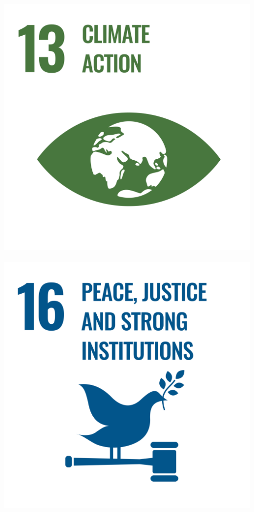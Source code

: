 \documentclass[../SustainableHEP.tex]{subfiles}
\begin{document}
\begin{center}
\includegraphics[width=\SDGsize]{Sections/Figs/Common/SDG_13_ClimateAction.png}~%
\includegraphics[width=\SDGsize]{Sections/Figs/Common/SDG_16_PeaceJusticeStrongInstitutions.png}~%

\end{center}
\end{document}

